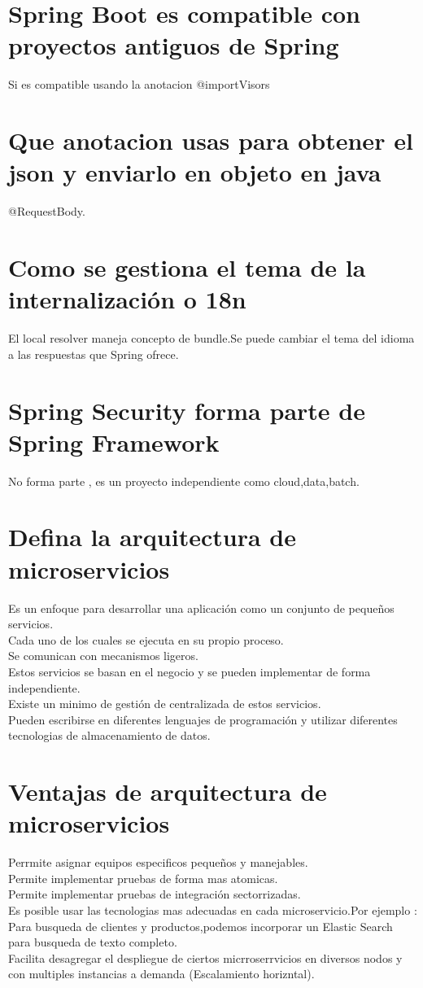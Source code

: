 \section{Spring Boot es compatible con proyectos antiguos de Spring}
Si es compatible usando la anotacion @importVisors
\section{Que anotacion usas para obtener el json y enviarlo en objeto en java}
@RequestBody.
\section{Como se gestiona el tema de la internalizaci\'on o 18n}
El local resolver maneja concepto de bundle.Se puede cambiar el tema del idioma 
a las respuestas que Spring ofrece.
\section{Spring Security forma parte de Spring Framework}
No forma parte , es un proyecto independiente como cloud,data,batch.
\section{Defina la arquitectura de microservicios}
Es un enfoque para desarrollar una aplicaci\'on como un conjunto de peque\~nos servicios.\\
Cada uno de los cuales se ejecuta en su propio proceso.\\
Se comunican con mecanismos ligeros.\\
Estos servicios se basan en el negocio y se pueden implementar de forma independiente.\\
Existe un minimo de gesti\'on de centralizada de estos servicios.\\
Pueden escribirse en diferentes lenguajes de programaci\'on y utilizar diferentes tecnologias de almacenamiento de datos.
\section{Ventajas de arquitectura de microservicios}
Perrmite asignar equipos especificos peque\~nos y manejables.\\
Permite implementar pruebas de forma mas atomicas.\\
Permite implementar pruebas de integraci\'on sectorrizadas.\\
Es posible usar las tecnologias mas adecuadas en cada microservicio.Por ejemplo : Para busqueda de
clientes y productos,podemos incorporar un Elastic Search para busqueda de texto completo.\\
Facilita desagregar el despliegue de ciertos micrroserrvicios en diversos nodos y con multiples instancias a
demanda (Escalamiento horizntal).
